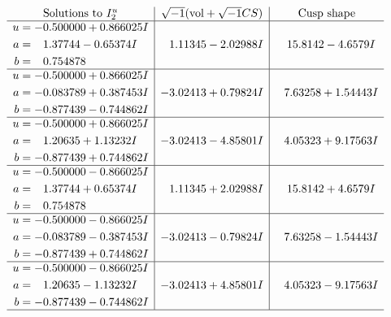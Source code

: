 \documentclass[1p]{elsarticle_modified}
\theoremstyle{definition}
\newcommand{\I}{\sqrt{-1}}
\begin{document}
$$\begin{array}{c|c|c}  
\text{Solutions to }I^u_{2}& \I (\text{vol} + \sqrt{-1}CS) & \text{Cusp shape}\\
 \hline 
\begin{aligned}
u &= -0.500000 + 0.866025 I \\
a &= \phantom{-}1.37744 - 0.65374 I \\
b &= \phantom{-}0.754878\phantom{ +0.000000I}\end{aligned}
 & \phantom{-}1.11345 - 2.02988 I & \phantom{-}15.8142 - 4.6579 I \\ \hline\begin{aligned}
u &= -0.500000 + 0.866025 I \\
a &= -0.083789 + 0.387453 I \\
b &= -0.877439 - 0.744862 I\end{aligned}
 & -3.02413 + 0.79824 I & \phantom{-}7.63258 + 1.54443 I \\ \hline\begin{aligned}
u &= -0.500000 + 0.866025 I \\
a &= \phantom{-}1.20635 + 1.13232 I \\
b &= -0.877439 + 0.744862 I\end{aligned}
 & -3.02413 - 4.85801 I & \phantom{-}4.05323 + 9.17563 I \\ \hline\begin{aligned}
u &= -0.500000 - 0.866025 I \\
a &= \phantom{-}1.37744 + 0.65374 I \\
b &= \phantom{-}0.754878\phantom{ +0.000000I}\end{aligned}
 & \phantom{-}1.11345 + 2.02988 I & \phantom{-}15.8142 + 4.6579 I \\ \hline\begin{aligned}
u &= -0.500000 - 0.866025 I \\
a &= -0.083789 - 0.387453 I \\
b &= -0.877439 + 0.744862 I\end{aligned}
 & -3.02413 - 0.79824 I & \phantom{-}7.63258 - 1.54443 I \\ \hline\begin{aligned}
u &= -0.500000 - 0.866025 I \\
a &= \phantom{-}1.20635 - 1.13232 I \\
b &= -0.877439 - 0.744862 I\end{aligned}
 & -3.02413 + 4.85801 I & \phantom{-}4.05323 - 9.17563 I\\
 \hline 
 \end{array}$$\newpage
\end{document}
